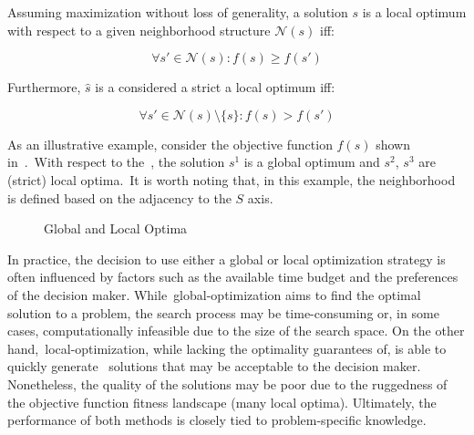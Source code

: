 \begin{definition}
  \label{def:local-optimum}

  Assuming maximization without loss of generality, a solution $s$ is
  a local optimum with respect to a given neighborhood structure $\mathcal{N}(s)$ iff:

  \begin{equation}
    \label{eq:local-optimum}
    \forall s' \in \mathcal{N}(s) \colon f(s) \geq f(s')
  \end{equation}

  Furthermore, $\hat{s}$ is a considered a strict a local optimum iff:

  \begin{equation}
    \label{eq:strict-local-optimum}
    \forall s' \in \mathcal{N}(s) \setminus \{s\} \colon f(s) > f(s')
  \end{equation}
\end{definition}

As an illustrative example, consider the objective function $f(s)$ shown
in~.~With respect to
the~, the solution $s^1$ is a global
optimum and $s^2$, $s^3$ are (strict) local optima.~It is worth noting that, in
this example, the neighborhood is defined based on the adjacency to the $S$ axis.

\begin{figure}[h]
  \centering
  
  \caption{Global and Local Optima}
  \label{fig:optima}
\end{figure}

In practice, the decision to use either a global or local optimization strategy
is often influenced by factors such as the available time budget and the
preferences of the decision maker. While~\acrshort{global-optimization} aims to
find the optimal solution to a problem, the search process may be time-consuming
or, in some cases, computationally infeasible due to the size of the search
space.  On the other hand,~\acrshort{local-optimization}, while lacking the
optimality guarantees of, is able to quickly generate~ solutions that may be
acceptable to the decision maker. Nonetheless, the quality of the solutions may
be poor due to the ruggedness of the objective function fitness landscape (many
local optima). Ultimately, the performance of both methods is closely tied to
problem-specific knowledge.

